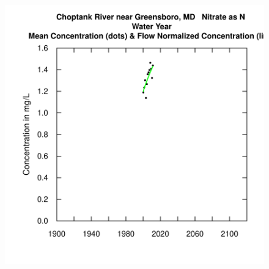 \documentclass[a4paper,11pt]{article}
\begin{document}
\begin{figure}[htbp]
  \begin{minipage}[h]{0.5\linewidth}
    \begin{center}

\includegraphics{EGRET-figplotConcHist}
    \label{fig:plotConcHist}
    \end{center}
  \end{minipage}
  \begin{minipage}[h]{0.5\linewidth}
    \begin{center}



\end{center}
\end{minipage}
\end{figure}
\end{document}

